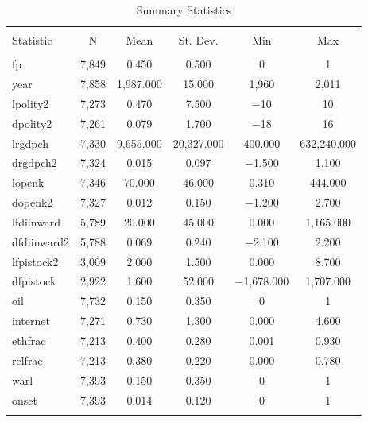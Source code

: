 \documentclass[12pt,a4paper]{article}\usepackage[]{graphicx}\usepackage[]{color}
\begin{document}
\begin{table}[!htbp] \centering 
  \caption{Summary Statistics} 
  \label{} 
\small 
\begin{tabular}{@{\extracolsep{5pt}}lccccc} 
\\[-1.8ex]\hline 
\hline \\[-1.8ex] 
Statistic & \multicolumn{1}{c}{N} & \multicolumn{1}{c}{Mean} & \multicolumn{1}{c}{St. Dev.} & \multicolumn{1}{c}{Min} & \multicolumn{1}{c}{Max} \\ 
\hline \\[-1.8ex] 
fp & 7,849 & 0.450 & 0.500 & 0 & 1 \\ 
year & 7,858 & 1,987.000 & 15.000 & 1,960 & 2,011 \\ 
lpolity2 & 7,273 & 0.470 & 7.500 & $-$10 & 10 \\ 
dpolity2 & 7,261 & 0.079 & 1.700 & $-$18 & 16 \\ 
lrgdpch & 7,330 & 9,655.000 & 20,327.000 & 400.000 & 632,240.000 \\ 
drgdpch2 & 7,324 & 0.015 & 0.097 & $-$1.500 & 1.100 \\ 
lopenk & 7,346 & 70.000 & 46.000 & 0.310 & 444.000 \\ 
dopenk2 & 7,327 & 0.012 & 0.150 & $-$1.200 & 2.700 \\ 
lfdiinward & 5,789 & 20.000 & 45.000 & 0.000 & 1,165.000 \\ 
dfdiinward2 & 5,788 & 0.069 & 0.240 & $-$2.100 & 2.200 \\ 
lfpistock2 & 3,009 & 2.000 & 1.500 & 0.000 & 8.700 \\ 
dfpistock & 2,922 & 1.600 & 52.000 & $-$1,678.000 & 1,707.000 \\ 
oil & 7,732 & 0.150 & 0.350 & 0 & 1 \\ 
internet & 7,271 & 0.730 & 1.300 & 0.000 & 4.600 \\ 
ethfrac & 7,213 & 0.400 & 0.280 & 0.001 & 0.930 \\ 
relfrac & 7,213 & 0.380 & 0.220 & 0.000 & 0.780 \\ 
warl & 7,393 & 0.150 & 0.350 & 0 & 1 \\ 
onset & 7,393 & 0.014 & 0.120 & 0 & 1 \\ 
\hline \\[-1.8ex] 
\end{tabular} 
\end{table} 
\end{document}
